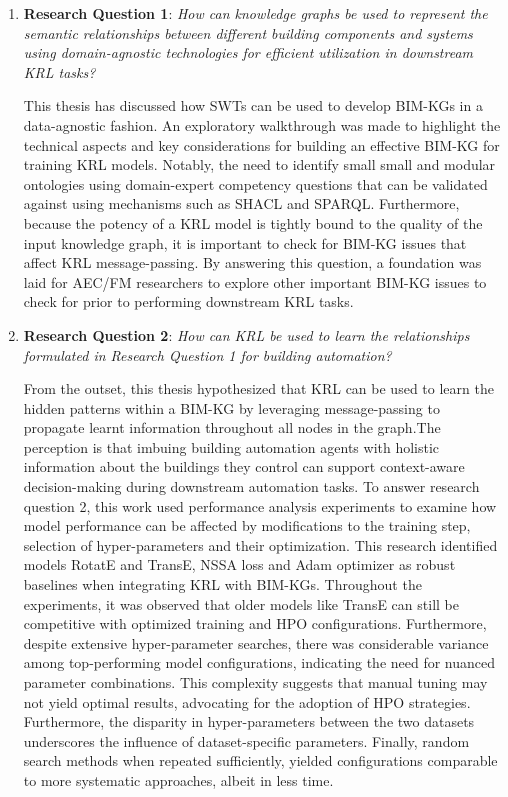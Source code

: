 \begin{enumerate}
    \item 
    \textbf{Research Question 1}: \textit{How can knowledge graphs be used to represent the semantic relationships between different building components and systems using domain-agnostic technologies for efficient utilization in downstream \ac{KRL} tasks?}

    This thesis has discussed how \acp{SWT} can be used to develop \acp{BIM-KG} in a data-agnostic fashion. An exploratory walkthrough was made to highlight the technical aspects and key considerations for building an effective \ac{BIM-KG} for training \ac{KRL} models. Notably, the need to identify small small and modular ontologies using domain-expert competency questions that can be validated against using mechanisms such as \ac{SHACL} and \ac{SPARQL}. Furthermore, because the potency of a \ac{KRL} model is tightly bound to the quality of the input knowledge graph, it is important to check for \ac{BIM-KG} issues that affect \ac{KRL} message-passing. By answering this question, a foundation was laid for \ac{AEC/FM} researchers to explore other important \ac{BIM-KG} issues to check for prior to performing downstream \ac{KRL} tasks.
    
    \item
    \textbf{Research Question 2}: \textit{How can KRL be used to learn the relationships formulated in Research Question 1 for building automation?}

    From the outset, this thesis hypothesized that \ac{KRL} can be used to learn the hidden patterns within a \ac{BIM-KG} by leveraging message-passing to propagate learnt information throughout all nodes in the graph.The perception is that imbuing building automation agents with holistic information about the buildings they control can support context-aware decision-making during downstream automation tasks. To answer research question 2, this work used performance analysis experiments to examine how model performance can be affected by modifications to the training step, selection of hyper-parameters and their optimization. This research identified models RotatE and TransE, NSSA loss and Adam optimizer as robust baselines when integrating \ac{KRL} with \acp{BIM-KG}. Throughout the experiments, it was observed that older models like TransE can still be competitive with optimized training and \ac{HPO} configurations. Furthermore, despite extensive hyper-parameter searches, there was considerable variance among top-performing model configurations, indicating the need for nuanced parameter combinations. This complexity suggests that manual tuning may not yield optimal results, advocating for the adoption of \ac{HPO} strategies. Furthermore, the disparity in hyper-parameters between the two datasets underscores the influence of dataset-specific parameters. Finally, random search methods when repeated sufficiently, yielded configurations comparable to more systematic approaches, albeit in less time.


\end{enumerate}
